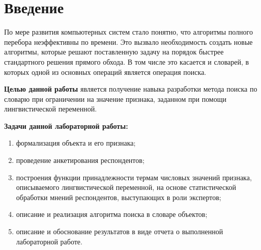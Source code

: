 \chapter*{Введение}
По мере развития компьютерных систем стало понятно, что алгоритмы полного перебора неэффективны по времени.
Это вызвало необходимость создать новые алгоритмы, которые решают поставленную задачу на порядок быстрее стандартного решения прямого обхода.
В том числе это касается и словарей, в которых одной из основных операций является операция поиска.

\textbf{Целью данной работы} является получение навыка разработки метода поиска по словарю при ограничении на значение признака, заданном при помощи лингвистической переменной.

\textbf{Задачи данной лабораторной работы:}
\begin{enumerate}
	\item формализация объекта и его признака;
	\item проведение анкетирования респондентов;
	\item построения функции принадлежности термам числовых значений признака, описываемого лингвистической переменной, на основе статистической обработки мнений респондентов, выступающих в роли экспертов;
	\item описание и реализация алгоритма поиска в словаре объектов;
	\item описание и обоснование результатов в виде отчета о выполненной лабораторной работе.
\end{enumerate}
